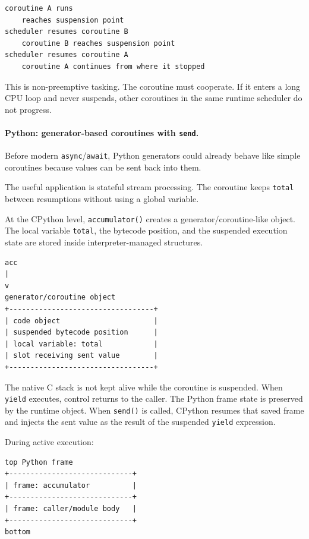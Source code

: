 \begin{verbatim}
coroutine A runs
    reaches suspension point
scheduler resumes coroutine B
    coroutine B reaches suspension point
scheduler resumes coroutine A
    coroutine A continues from where it stopped
\end{verbatim}

This is non-preemptive tasking. The coroutine must cooperate. If it enters a long CPU loop and never suspends, other coroutines in the same runtime scheduler do not progress.

\paragraph{Python: generator-based coroutines with \texttt{send}.}

Before modern \texttt{async}/\texttt{await}, Python generators could already behave like simple coroutines because values can be sent back into them.

The useful application is stateful stream processing. The coroutine keeps \texttt{total} between resumptions without using a global variable.

At the CPython level, \texttt{accumulator()} creates a generator/coroutine-like object. The local variable \texttt{total}, the bytecode position, and the suspended execution state are stored inside interpreter-managed structures.

\begin{verbatim}
acc
|
v
generator/coroutine object
+----------------------------------+
| code object                      |
| suspended bytecode position      |
| local variable: total            |
| slot receiving sent value        |
+----------------------------------+
\end{verbatim}

The native C stack is not kept alive while the coroutine is suspended. When \texttt{yield} executes, control returns to the caller. The Python frame state is preserved by the runtime object. When \texttt{send()} is called, CPython resumes that saved frame and injects the sent value as the result of the suspended \texttt{yield} expression.

During active execution:

\begin{verbatim}
top Python frame
+-----------------------------+
| frame: accumulator          |
+-----------------------------+
| frame: caller/module body   |
+-----------------------------+
bottom
\end{verbatim}

